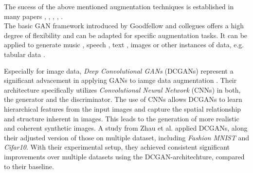 The sucess of the above mentioned augmentation techniques is established in many papers \cite{perez2017effectivenessdataaugmentationimage}, \cite{NIPS2012_c399862d}, \cite{Ying2019overfittinganditssolutions}, \cite{shorten2019survey}, \cite{WanLiZeiler2013}.\\





The basic GAN framework introduced by Goodfellow and collegues offers a high degree of flexibility and can be adapted for specific augmentation tasks. It can be applied to generate music \cite{dong2017museganmultitracksequentialgenerative}, speech \cite{li2022ttsgantransformerbasedtimeseriesgenerative}, text \cite{yu2017seqgansequencegenerativeadversarial}, images \cite{goodfellow2014generativeadversarialnetworks} or other instances of data, e.g. tabular data \cite{xu2019modelingtabulardatausing}. 

Especially for image data, \textit{Deep Convolutional GANs} (DCGANs) represent a significant advacement in applying GANs to iamge data augmentation \cite{huang2022tutorial}. Their architecture specifically utilizes \textit{Convolutional Neural Network} (CNNs) \cite{LeCun1989firstcnnpaper} in both, the generator and the discriminator. The use of CNNs allows DCGANs to learn hierarchical features from the input images and capture the spatial relationship and structure inherent in images. This leads to the generation of more realistic and coherent synthetic images. A study from Zhau et al. \cite{zhao2023gan} applied DCGANs, along their adjusted version of those on multiple dataset, including \textit{Fashion MNIST} and \textit{Cifar10}. With their experimental setup, they achieved consistent significant improvements over multiple datasets using the DCGAN-architechture, compared to their baseline. 




